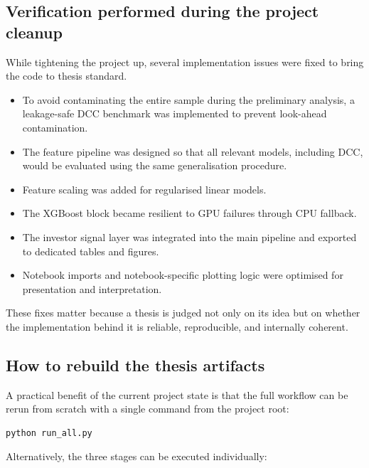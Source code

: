 \subsection{Verification performed during the project cleanup}

While tightening the project up, several implementation issues were fixed to bring the code to thesis standard.

\begin{itemize}
    \item To avoid contaminating the entire sample during the preliminary analysis, a leakage-safe DCC benchmark was implemented to prevent look-ahead contamination.
    \item The feature pipeline was designed so that all relevant models, including DCC, would be evaluated using the same generalisation procedure.
    \item Feature scaling was added for regularised linear models.
    \item The XGBoost block became resilient to GPU failures through CPU fallback.
    \item The investor signal layer was integrated into the main pipeline and exported to dedicated tables and figures.
    \item Notebook imports and notebook-specific plotting logic were optimised for presentation and interpretation.
\end{itemize}

These fixes matter because a thesis is judged not only on its idea but on whether the implementation behind it is reliable, reproducible, and internally coherent.

\subsection{How to rebuild the thesis artifacts}

A practical benefit of the current project state is that the full workflow can be rerun from scratch with a single command from the project root:

\begin{lstlisting}[language={}, caption={Full rebuild from the project root directory.}, label=lst:rebuild]
python run_all.py
\end{lstlisting}

Alternatively, the three stages can be executed individually:

